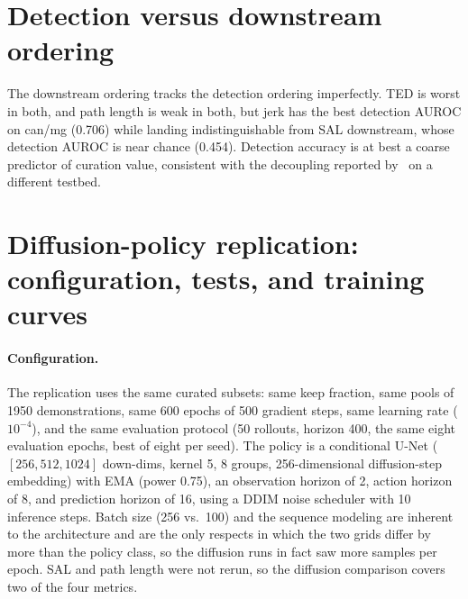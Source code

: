 \documentclass[10pt]{article}
\begin{document}
\section{Detection versus downstream ordering}
\label{app:ordering}

The downstream ordering tracks the detection ordering imperfectly. TED is
worst in both, and path length is weak in both, but jerk has the best
detection AUROC on can/mg (0.706) while landing indistinguishable from SAL
downstream, whose detection AUROC is near chance (0.454). Detection accuracy
is at best a coarse predictor of curation value, consistent with the
decoupling reported by~\citep{bedi-policy} on a different testbed.

\section{Diffusion-policy replication: configuration, tests, and training
curves}
\label{app:dpdetail}

\paragraph{Configuration.} The replication uses the same curated subsets:
same keep fraction, same pools of 1950 demonstrations, same 600 epochs of 500
gradient steps, same learning rate ($10^{-4}$), and the same evaluation
protocol (50 rollouts, horizon 400, the same eight evaluation epochs, best of eight per seed). The policy is a conditional U-Net ($[256, 512, 1024]$ down-dims,
kernel 5, 8 groups, 256-dimensional diffusion-step embedding) with EMA
(power 0.75), an observation horizon of 2, action horizon of 8, and
prediction horizon of 16, using a DDIM noise scheduler with 10 inference
steps. Batch size (256 vs.\ 100) and the sequence modeling are inherent to
the architecture and are the only respects in which the two grids differ by
more than the policy class, so the diffusion runs in fact saw more samples
per epoch. SAL and path length were not rerun, so the diffusion comparison
covers two of the four metrics.
\end{document}

